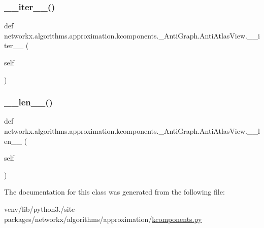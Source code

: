 \subsubsection{\texorpdfstring{\+\_\+\+\_\+iter\+\_\+\+\_\+()}{\_\_iter\_\_()}}
{\footnotesize\ttfamily def networkx.\+algorithms.\+approximation.\+kcomponents.\+\_\+\+Anti\+Graph.\+Anti\+Atlas\+View.\+\_\+\+\_\+iter\+\_\+\+\_\+ (\begin{DoxyParamCaption}\item[{}]{self }\end{DoxyParamCaption})}

\mbox{\label{classnetworkx_1_1algorithms_1_1approximation_1_1kcomponents_1_1__AntiGraph_1_1AntiAtlasView_ac0cfdb64b2934527c2de0ba5ae23afd3}} 
\subsubsection{\texorpdfstring{\+\_\+\+\_\+len\+\_\+\+\_\+()}{\_\_len\_\_()}}
{\footnotesize\ttfamily def networkx.\+algorithms.\+approximation.\+kcomponents.\+\_\+\+Anti\+Graph.\+Anti\+Atlas\+View.\+\_\+\+\_\+len\+\_\+\+\_\+ (\begin{DoxyParamCaption}\item[{}]{self }\end{DoxyParamCaption})}



The documentation for this class was generated from the following file\+:\begin{DoxyCompactItemize}
\item 
venv/lib/python3./site-\/packages/networkx/algorithms/approximation/\hyperlink{approximation_2kcomponents_8py}{kcomponents.\+py}\end{DoxyCompactItemize}
